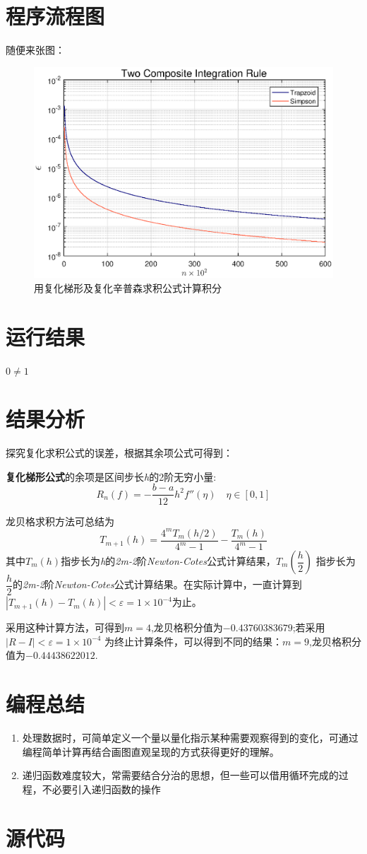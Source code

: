 \documentclass{njureport}
\begin{document}
\section{程序流程图}
随便来张图：
\begin{figure}[H]
 \center\includegraphics[width=\textwidth]{material/6_1_e.eps}
 \caption{\textrm{用复化梯形及复化辛普森求积公式计算积分}}
 \end{figure}

\section{运行结果}
    $0\neq1$
\section{结果分析}
\begin{description}[itemindent=1em]
  \item[算法1] 探究复化求积公式的误差，根据其余项公式可得到：

    \textbf{复化梯形公式}的余项是区间步长\textit{h}的2阶无穷小量:
     $$R_n(f)=-\dfrac{b-a}{12}h^2f''(\eta)\quad\eta\in[0,1]$$
  \item[算法2] 龙贝格求积方法可总结为$$T_{m+1}(h)=\dfrac{4^mT_m(h/2)}{4^m-1}-\dfrac{T_m(h)}{4^m-1}$$
    其中$T_m(h)$指步长为\emph{h}的\emph{2m-2}阶\emph{Newton-Cotes}公式计算结果，$T_m(\dfrac{h}2)$ 指步长为${\dfrac{h}2}$的\emph{2m-2}阶\emph{Newton-Cotes}公式计算结果。在实际计算中，一直计算到$|T_{m+1}(h)-T_m(h)|<\varepsilon=1\times10^{-4}$为止。

    采用这种计算方法，可得到$m=4$,龙贝格积分值为\textcolor[rgb]{1.00,0.00,0.00}{$-0.43760383679$};若采用$|R-I|<\varepsilon=1\times10^{-4}$ 为终止计算条件，可以得到不同的结果：$m=9$,龙贝格积分值为\textcolor[rgb]{1.00,0.00,0.00}{$-0.44438622012$}.
\end{description}
\section{编程总结}
\begin{enumerate}[1.]
  \item 处理数据时，可简单定义一个量以量化指示某种需要观察得到的变化，可通过编程简单计算再结合画图直观呈现的方式获得更好的理解。
  \item 递归函数难度较大，常需要结合分治的思想，但一些可以借用循环完成的过程，不必要引入递归函数的操作
\end{enumerate}

\section{源代码}
 
\end{document}
